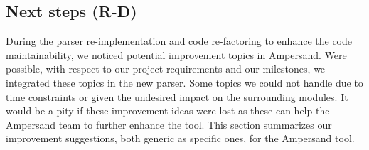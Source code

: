 
\subsection{Next steps (R-D)}
\label{design:next-steps}
During the parser re-implementation and code re-factoring to enhance the code maintainability, we noticed potential improvement topics in Ampersand.
Were possible, with respect to our project requirements and our milestones, we integrated these topics in the new parser.
Some topics we could not handle due to time constraints or given the undesired impact on the surrounding modules.
It would be a pity if these improvement ideas were lost as these can help the Ampersand team to further enhance the tool.
This section summarizes our improvement suggestions, both generic as specific ones, for the Ampersand tool.

